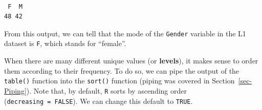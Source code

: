 \documentclass[
  letterpaper,
  DIV=11,
  numbers=noendperiod]{scrreprt}
\newenvironment{Shaded}{\begin{snugshade}}{\end{snugshade}}
\newcommand{\AttributeTok}[1]{\textcolor[rgb]{0.40,0.45,0.13}{#1}}
\newcommand{\ConstantTok}[1]{\textcolor[rgb]{0.56,0.35,0.01}{#1}}
\newcommand{\FunctionTok}[1]{\textcolor[rgb]{0.28,0.35,0.67}{#1}}
\newcommand{\NormalTok}[1]{\textcolor[rgb]{0.00,0.23,0.31}{#1}}
\newcommand{\SpecialCharTok}[1]{\textcolor[rgb]{0.37,0.37,0.37}{#1}}
\begin{document}
\begin{verbatim}

 F  M 
48 42 
\end{verbatim}

From this output, we can tell that the mode of the \texttt{Gender}
variable in the L1 dataset is \texttt{F}, which stands for ``female''.

When there are many different unique values (or \textbf{levels}), it
makes sense to order them according to their frequency. To do so, we can
pipe the output of the \texttt{table()} function into the
\texttt{sort()} function (piping was covered in
Section~\ref{sec-Piping}). Note that, by default, \texttt{R} sorts by
ascending order (\texttt{decreasing\ =\ FALSE}). We can change this
default to \texttt{TRUE}.

\begin{Shaded}
\end{Shaded}
\end{document}
